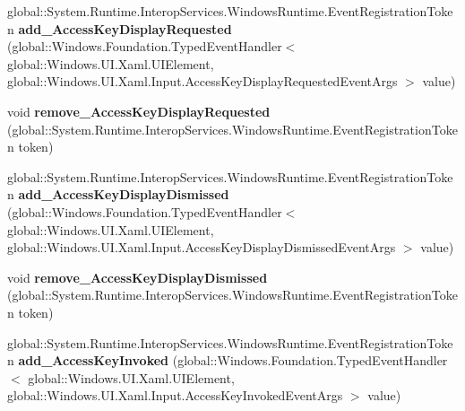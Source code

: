 \begin{DoxyCompactItemize}
\item 
\mbox{\label{interface_windows_1_1_u_i_1_1_xaml_1_1_i_u_i_element4_a35fc44f1af8aacfcb2a3ff829fcb7d50}} 
global\+::\+System.\+Runtime.\+Interop\+Services.\+Windows\+Runtime.\+Event\+Registration\+Token {\bfseries add\+\_\+\+Access\+Key\+Display\+Requested} (global\+::\+Windows.\+Foundation.\+Typed\+Event\+Handler$<$ global\+::\+Windows.\+U\+I.\+Xaml.\+U\+I\+Element, global\+::\+Windows.\+U\+I.\+Xaml.\+Input.\+Access\+Key\+Display\+Requested\+Event\+Args $>$ value)
\item 
\mbox{\label{interface_windows_1_1_u_i_1_1_xaml_1_1_i_u_i_element4_aea049ec23f1d2f3b558644a30bbda62d}} 
void {\bfseries remove\+\_\+\+Access\+Key\+Display\+Requested} (global\+::\+System.\+Runtime.\+Interop\+Services.\+Windows\+Runtime.\+Event\+Registration\+Token token)
\item 
\mbox{\label{interface_windows_1_1_u_i_1_1_xaml_1_1_i_u_i_element4_a9d51d9f59f40a6fabc504798338e3514}} 
global\+::\+System.\+Runtime.\+Interop\+Services.\+Windows\+Runtime.\+Event\+Registration\+Token {\bfseries add\+\_\+\+Access\+Key\+Display\+Dismissed} (global\+::\+Windows.\+Foundation.\+Typed\+Event\+Handler$<$ global\+::\+Windows.\+U\+I.\+Xaml.\+U\+I\+Element, global\+::\+Windows.\+U\+I.\+Xaml.\+Input.\+Access\+Key\+Display\+Dismissed\+Event\+Args $>$ value)
\item 
\mbox{\label{interface_windows_1_1_u_i_1_1_xaml_1_1_i_u_i_element4_a3571804f8a98025c430544d76cfc6f74}} 
void {\bfseries remove\+\_\+\+Access\+Key\+Display\+Dismissed} (global\+::\+System.\+Runtime.\+Interop\+Services.\+Windows\+Runtime.\+Event\+Registration\+Token token)
\item 
\mbox{\label{interface_windows_1_1_u_i_1_1_xaml_1_1_i_u_i_element4_abbf41cd69a2641b693ab19a02690a325}} 
global\+::\+System.\+Runtime.\+Interop\+Services.\+Windows\+Runtime.\+Event\+Registration\+Token {\bfseries add\+\_\+\+Access\+Key\+Invoked} (global\+::\+Windows.\+Foundation.\+Typed\+Event\+Handler$<$ global\+::\+Windows.\+U\+I.\+Xaml.\+U\+I\+Element, global\+::\+Windows.\+U\+I.\+Xaml.\+Input.\+Access\+Key\+Invoked\+Event\+Args $>$ value)

\end{DoxyCompactItemize}

